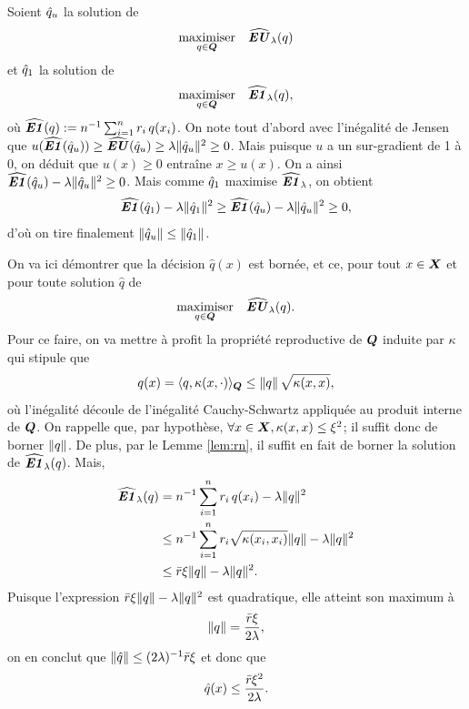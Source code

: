 \begin{lemme}
  \label{lem:rn}
  Soient $\qu$ la solution de
  \begin{equation}
    \maximizeEquation[q \in \Q]{\hEU_\lambda(q)}
  \end{equation}
  et $\qn$ la solution de
  \begin{equation}
    \maximizeEquation[q \in \Q]{\hEN_\lambda(q),}
  \end{equation}
  où $\hEN(q):=n^{-1}\sumi r_i\,q(x_i)$. On note tout d'abord avec l'inégalité de Jensen
  que $u(\hEN(\qu)) \geq \hEU(\qu) \geq \lambda\nq{\qu}^2 \geq 0$. Mais puisque $u$ a un sur-gradient de
  1 à $0$, on déduit que $u(x) \geq 0$ entraîne $x \geq u(x)$. On a ainsi
  $\hEN(\qu) - \lambda\nq{\qu}^2 \geq 0$. Mais comme $\qn$ maximise $\hEN_\lambda$, on obtient
  \begin{equation}
    \hEN(\qn) - \lambda\nq{\qn}^2 \geq \hEN(\qu) - \lambda\nq{\qu}^2 \geq 0,
  \end{equation}
  d'où on tire finalement $\nq{\qu} \leq \nq{\qn}$.
\end{lemme}


\begin{lemme}
  \label{lem:bqhat}
  On va ici démontrer que la décision $\hat q(x)$ est bornée, et ce, pour tout $x \in \X$ et
  pour toute solution $\hat q$ de
  \begin{equation}
    \label{b:l1}
    \maximizeEquation[q \in \Q]{\hEU_\lambda(q).}
  \end{equation}
  Pour ce faire, on va mettre à profit la propriété reproductive de $\Q$ induite par
  $\kappa$ qui stipule que
  \begin{equation}
    q(x) = \langle q, \kappa(x,\cdot)\rangle_{\Q} \leq\nq{q}\,\sqrt{\kappa(x,x)},
  \end{equation}
  où l'inégalité découle de l'inégalité Cauchy-Schwartz appliquée au produit interne de
  $\Q$.  On rappelle que, par hypothèse, $\forall x\in\X, \kappa(x,x) \leq \xi^2$; il suffit donc de borner
  $\nq{q}$. De plus, par le Lemme \ref{lem:rn}, il suffit en fait de borner la solution de
  $\hEN_\lambda(q)$. Mais,
  \begin{align}
    \hEN_\lambda(q) &= n^{-1}\sumi r_i\,q(x_i) - \lambda\nq{q}^2\\
              & \leq n^{-1}\sumi r_i\sqrt{\kappa(x_i,x_i)}\nq{q} - \lambda\nq{q}^2\\
              & \leq \rmax \xi \nq{q} - \lambda\nq{q}^2.
  \end{align}
  Puisque l'expression $\rmax \xi \nq{q} - \lambda\nq{q}^2$ est quadratique, elle atteint son
  maximum à
  \begin{equation}
    \nq{q} = \frac{\rmax \xi}{2\lambda},
  \end{equation}
  on en conclut que $\nq{\hat q} \leq (2\lambda)^{-1}\rmax\xi$ et donc que
  \begin{equation}
    \hat q(x) \leq \frac{\rmax\xi^2}{2\lambda}.
  \end{equation}
\end{lemme}



